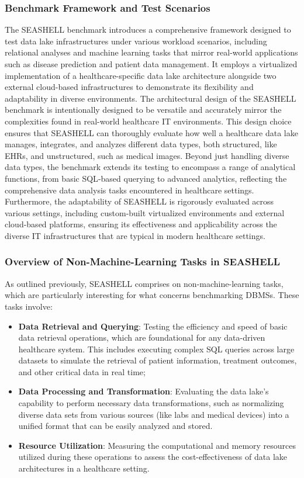 \subsubsection{Benchmark Framework and Test Scenarios}
The \ac{SEASHELL} benchmark introduces a comprehensive framework designed to test data lake infrastructures under various workload scenarios, including relational analyses and machine learning tasks that mirror real-world applications such as disease prediction and patient data management. It employs a virtualized implementation of a healthcare-specific data lake architecture alongside two external cloud-based infrastructures to demonstrate its flexibility and adaptability in diverse environments. The architectural design of the \ac{SEASHELL} benchmark is intentionally designed to be versatile and accurately mirror the complexities found in real-world healthcare \ac{IT} environments. This design choice ensures that \ac{SEASHELL} can thoroughly evaluate how well a healthcare data lake manages, integrates, and analyzes different data types, both structured, like \ac{EHR}s, and unstructured, such as medical images. Beyond just handling diverse data types, the benchmark extends its testing to encompass a range of analytical functions, from basic \ac{SQL}-based querying to advanced analytics, reflecting the comprehensive data analysis tasks encountered in healthcare settings. Furthermore, the adaptability of \ac{SEASHELL} is rigorously evaluated across various settings, including custom-built virtualized environments and external cloud-based platforms, ensuring its effectiveness and applicability across the diverse \ac{IT} infrastructures that are typical in modern healthcare settings.
\subsubsection{Overview of Non-Machine-Learning Tasks in SEASHELL}
As outlined previously, \ac{SEASHELL} comprises on non-machine-learning tasks, which are particularly interesting for what concerns benchmarking \ac{DBMS}s. These tasks involve:
\begin{itemize}
	\item \textbf{Data Retrieval and Querying}: Testing the efficiency and speed of basic data retrieval operations, which are foundational for any data-driven healthcare system. This includes executing complex \ac{SQL} queries across large datasets to simulate the retrieval of patient information, treatment outcomes, and other critical data in real time;
	\item \textbf{Data Processing and Transformation}: Evaluating the data lake's capability to perform necessary data transformations, such as normalizing diverse data sets from various sources (like labs and medical devices) into a unified format that can be easily analyzed and stored.
	\item \textbf{Resource Utilization}: Measuring the computational and memory resources utilized during these operations to assess the cost-effectiveness of data lake architectures in a healthcare setting.
\end{itemize}
